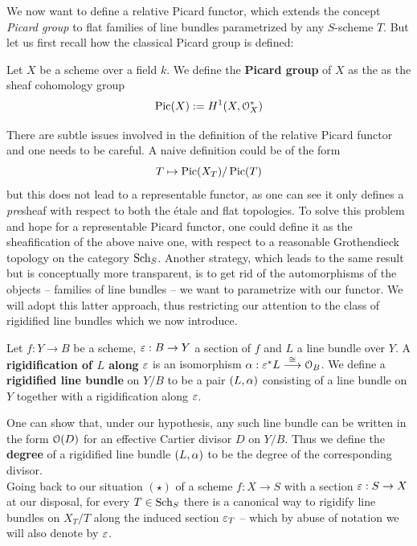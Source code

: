 	We now want to define a relative Picard functor, which extends the concept \emph{Picard group} to flat families of line bundles parametrized by any $S$-scheme $T$. But let us first recall how the classical Picard group is defined:
	\begin{defi}
		Let $X$ be a scheme over a field $k$. We define the \textbf{Picard group} of $X$ as the as the sheaf cohomology group
		$$ \operatorname{Pic}(X) := H^1(X, \mathcal{O}_X^*) $$
	\end{defi}
	There are subtle issues involved in the definition of the relative Picard functor and one needs to be careful. A naive definition could be of the form
	$$ T \mapsto \operatorname{Pic}(X_T)/\operatorname{Pic}(T) $$
	but this does not lead to a representable functor, as one can see it only defines a \emph{pre}sheaf with respect to both the \'etale and flat topologies. 
	To solve this problem and hope for a representable Picard functor, one could define it as the sheafification of the above naive one, with respect to a reasonable Grothendieck topology on the category $\operatorname{Sch}_S$. Another strategy, which leads to the same result but is conceptually more transparent, is to get rid of the automorphisms of the objects -- families of line bundles -- we want to parametrize with our functor. 
	We will adopt this latter approach, thus restricting our attention to the class of rigidified line bundles which we now introduce.
	\begin{defi}
		Let $f:Y\to B$ be a scheme, $\varepsilon:B\to Y$ a section of $f$ and $L$ a line bundle over $Y$.
		A \textbf{rigidification of $L$ along} $\varepsilon$ is an isomorphism $\alpha: \varepsilon^*L \overset{\cong}\longrightarrow \mathcal{O}_B $.
		We define a \textbf{rigidified line bundle} on $Y/B$ to be a pair $(L,\alpha)$ consisting of a line bundle on $Y$ together with a rigidification along $\varepsilon$.
	\end{defi}

	One can show that, under our hypothesis, any such line bundle can be written in the form $\mathcal{O}(D)$ for an effective Cartier divisor $D$ on $Y/B$. Thus we define the \textbf{degree} of a rigidified line bundle $(L,\alpha)$ to be the degree of the corresponding divisor.\\

	Going back to our situation $(\star)$ of a scheme $f:X\to S$ with a section $\varepsilon:S\to X$ at our disposal, for every $T\in \operatorname{Sch}_S$ there is a canonical way to rigidify line bundles on $X_T/T$ along the induced section $\varepsilon_T$ -- which by abuse of notation we will also denote by $\varepsilon$. 

